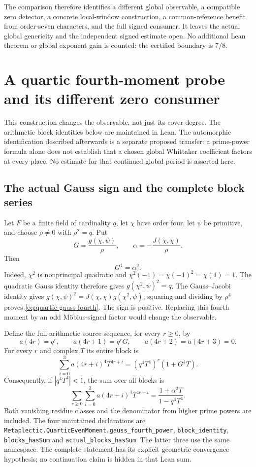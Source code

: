 \documentclass[11pt]{article}
\begin{document}
The comparison therefore identifies a different global observable,
a compatible zero detector, a concrete local-window construction,
a common-reference benefit from order-seven characters, and the full
signed consumer. It leaves the actual global genericity and the
independent signed estimate open. No additional Lean theorem or
global exponent gain is counted: the certified boundary is \(7/8\).

\section{A quartic fourth-moment probe and its different zero consumer}
\label{sec:quartic-even-moment}

This construction changes the observable, not just its cover degree.
The arithmetic block identities below are maintained in Lean. The
automorphic identification described afterwards is a separate proposed
transfer: a prime-power formula alone does not establish that a chosen
global Whittaker coefficient factors at every place. No estimate for
that continued global period is asserted here.

\subsection{The actual Gauss sign and the complete block series}
Let $F$ be a finite field of cardinality $q$, let $\chi$ have order four,
let $\psi$ be primitive, and choose $\rho\ne0$ with $\rho^2=q$. Put
\[
 G=\frac{g(\chi,\psi)}{\rho},
 \qquad \alpha=-\frac{J(\chi,\chi)}{\rho}.
\]
Then
\begin{equation}\label{eq:quartic-gauss-fourth}
 G^4=\alpha^2 .
\end{equation}
Indeed, $\chi^2$ is nonprincipal quadratic and
$\chi^2(-1)=\chi(-1)^2=\chi(1)=1$. The quadratic Gauss identity therefore
gives $g(\chi^2,\psi)^2=q$. The Gauss--Jacobi identity gives
$g(\chi,\psi)^2=J(\chi,\chi)g(\chi^2,\psi)$; squaring and dividing by
$\rho^4$ proves \eqref{eq:quartic-gauss-fourth}.
The sign is positive. Replacing this fourth moment by an odd
M\"obius-signed factor would change the observable.

Define the full arithmetic source sequence, for every $r\ge0$, by
\[
 a(4r)=q^r,\qquad a(4r+1)=q^rG,\qquad
 a(4r+2)=a(4r+3)=0.
\]
For every $r$ and complex $T$ its entire block is
\[
 \sum_{i=0}^3 a(4r+i)^4T^{4r+i}
   =(q^4T^4)^r(1+G^4T).
\]
Consequently, if $|q^4T^4|<1$, the sum over all blocks is
\begin{equation}\label{eq:quartic-full-block}
 \sum_{r\ge0}\sum_{i=0}^3a(4r+i)^4T^{4r+i}
   =\frac{1+\alpha^2T}{1-q^4T^4}.
\end{equation}
Both vanishing residue classes and the denominator from higher prime
powers are included. The four maintained declarations are
\texttt{Metaplectic.QuarticEvenMoment.gauss\_fourth\_power},
\texttt{block\_identity}, \texttt{blocks\_hasSum} and
\texttt{actual\_blocks\_hasSum}. The latter three use the same namespace.
The complete statement has its explicit geometric-convergence hypothesis;
no continuation claim is hidden in that Lean sum.
\end{document}

